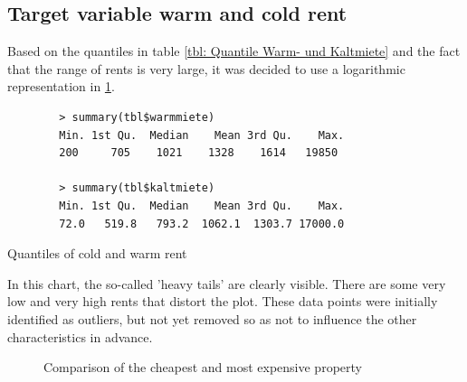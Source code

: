\subsection{Target variable warm and cold rent}

Based on the quantiles in table \ref{tbl: Quantile Warm- und Kaltmiete} and the fact that the range of rents is very large, it was decided to use a logarithmic representation in \ref{fig: log warm und kaltmiete}.

\begin{table}[H]
	\begin{verbatim}
		> summary(tbl$warmmiete)
		Min. 1st Qu.  Median    Mean 3rd Qu.    Max. 
		200     705    1021    1328    1614   19850 
		
		> summary(tbl$kaltmiete)
		Min. 1st Qu.  Median    Mean 3rd Qu.    Max. 
		72.0   519.8   793.2  1062.1  1303.7 17000.0 
	\end{verbatim}
	\caption{Quantiles of cold and warm rent}
	\label{tbl: Quantile Warm- und Kaltmiete}
\end{table}
In this chart, the so-called 'heavy tails' are clearly visible. There are some very low and very high rents that distort the plot. These data points were initially identified as outliers, but not yet removed so as not to influence the other characteristics in advance.

\begin{figure}[H]
	\caption{Comparison of the cheapest and most expensive property }
	\label{fig: log warm und kaltmiete}
\end{figure}

